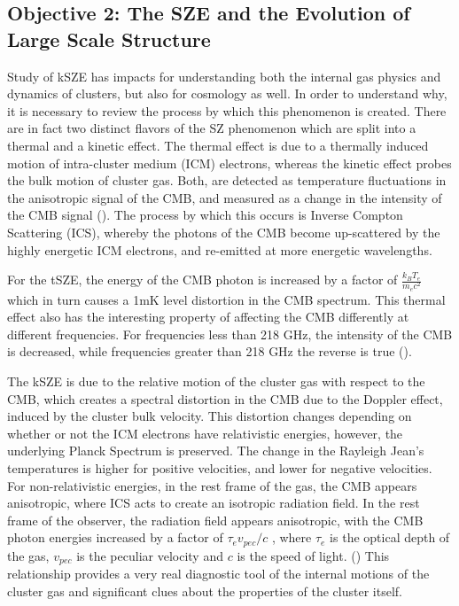 \documentclass[manuscript]{aastex}
\begin{document}
\subsection{\textbf{Objective 2: The SZE and the Evolution of Large Scale Structure}}

Study of kSZE has impacts for understanding both the internal gas physics and dynamics of clusters, but also for cosmology as well. In order to understand why, it is necessary to review the process by which this phenomenon is created. There are in fact two distinct flavors of the SZ phenomenon which are split into a thermal and a kinetic effect. The thermal effect is due to a thermally induced motion of intra-cluster medium (ICM) electrons, whereas the kinetic effect probes the bulk motion of cluster gas. Both, are detected as temperature fluctuations in the anisotropic signal of the CMB, and measured as a change in the intensity of the CMB signal (\cite{Sunyaev1970}).  The process by which this occurs is Inverse Compton Scattering (ICS), whereby the photons of the CMB become up-scattered by the highly energetic ICM electrons, and re-emitted at more energetic wavelengths. 

For the tSZE, the energy of the CMB photon is increased by a factor of \(\frac{k_{B}T_{e}}{m_{e}c^{2}}\) which in turn causes a 1mK level distortion in the CMB spectrum. This thermal effect also has the interesting property of affecting the CMB differently at different frequencies. For frequencies less than 218 GHz, the intensity of the CMB is decreased, while frequencies greater than 218 GHz the reverse is true (\cite{Carlstrom2002}). 

The kSZE is due to the relative motion of the cluster gas with respect to the CMB, which creates a spectral distortion in the CMB due to the Doppler effect, induced by the cluster bulk velocity.  This distortion changes depending on whether or not the ICM electrons have relativistic energies, however, the underlying Planck Spectrum is preserved. The change in the Rayleigh Jean's temperatures is higher for positive velocities, and lower for negative velocities. For non-relativistic energies, in the rest frame of the gas, the CMB appears anisotropic, where ICS acts to create an isotropic radiation field. In the rest frame of the observer, the radiation field appears anisotropic, with the CMB photon energies increased by a factor of \(\tau_{e} v_{pec} / c\) , where \(\tau_{e}\) is the optical depth of the gas, \(v_{pec}\) is the peculiar velocity and \(c\) is the speed of light. (\cite{Birkinshaw1999}) This relationship provides a very real diagnostic tool of the internal motions of the cluster gas and significant clues about the properties of the cluster itself.
\end{document}
